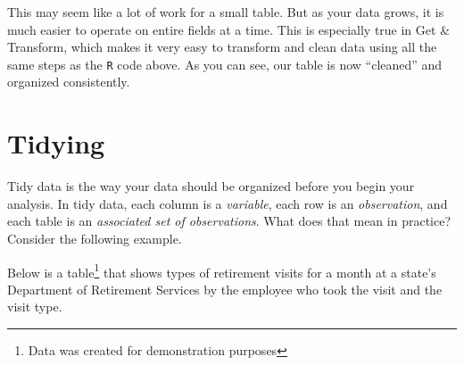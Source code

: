 \documentclass[]{book}
\newenvironment{Shaded}{\begin{snugshade}}{\end{snugshade}}
\newcommand{\CommentTok}[1]{\textcolor[rgb]{0.56,0.35,0.01}{\textit{#1}}}
\newcommand{\DataTypeTok}[1]{\textcolor[rgb]{0.13,0.29,0.53}{#1}}
\newcommand{\KeywordTok}[1]{\textcolor[rgb]{0.13,0.29,0.53}{\textbf{#1}}}
\newcommand{\NormalTok}[1]{#1}
\newcommand{\OperatorTok}[1]{\textcolor[rgb]{0.81,0.36,0.00}{\textbf{#1}}}
\newcommand{\OtherTok}[1]{\textcolor[rgb]{0.56,0.35,0.01}{#1}}
\newcommand{\StringTok}[1]{\textcolor[rgb]{0.31,0.60,0.02}{#1}}
\begin{document}
\begin{Shaded}
\begin{Highlighting}[]
{{{{{\CommentTok{#print to datatable}
\NormalTok{sites_cleaned}\OperatorTok{%
    \DataTypeTok{extensions =} \StringTok{'Buttons'}\NormalTok{, }
    \DataTypeTok{options =} \KeywordTok{list}\NormalTok{(}\DataTypeTok{dom =} \StringTok{'Bfrtip'}\NormalTok{, }
                   \DataTypeTok{buttons =} \StringTok{'excel'}\NormalTok{,}
                   \DataTypeTok{searching =} \OtherTok{FALSE}\NormalTok{))}
\end{Highlighting}
\end{Shaded}

\hypertarget{htmlwidget-c20dea9d778f0b1519ef}{}

This may seem like a lot of work for a small table. But as your data grows, it is much easier to operate on entire fields at a time. This is especially true in Get \& Transform, which makes it very easy to transform and clean data using all the same steps as the \texttt{R} code above. As you can see, our table is now ``cleaned'' and organized consistently.

\hypertarget{tidying}{%
\section{Tidying}\label{tidying}}

Tidy data is the way your data should be organized before you begin your analysis. In tidy data, each column is a \emph{variable}, each row is an \emph{observation}, and each table is an \emph{associated set of observations}. What does that mean in practice? Consider the following example.

Below is a table\footnote{Data was created for demonstration purposes} that shows types of retirement visits for a month at a state's Department of Retirement Services by the employee who took the visit and the visit type.
\end{document}

